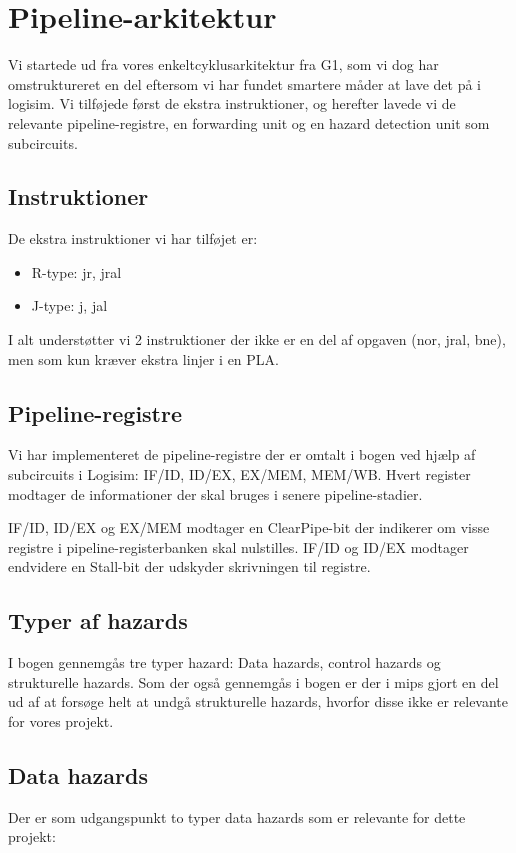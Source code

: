\section{Pipeline-arkitektur}

Vi startede ud fra vores enkeltcyklusarkitektur fra G1, som vi dog har omstruktureret en del
eftersom vi har fundet smartere måder at lave det på i logisim. Vi tilføjede først de ekstra
instruktioner, og herefter lavede vi de relevante pipeline-registre, en forwarding unit og 
en hazard detection unit som subcircuits.  

\subsection{Instruktioner}
De ekstra instruktioner vi har tilføjet er:
\begin{itemize}
\item R-type: jr, jral
\item J-type: j, jal
\end{itemize}

I alt understøtter vi 2 instruktioner der ikke er en del af opgaven (nor, jral, bne), men som kun kræver ekstra
linjer i en PLA. 

\subsection{Pipeline-registre}

Vi har implementeret de pipeline-registre der er omtalt i bogen ved hjælp af
subcircuits i Logisim: IF/ID, ID/EX, EX/MEM, MEM/WB. Hvert register modtager
de informationer der skal bruges i senere pipeline-stadier.

IF/ID, ID/EX og EX/MEM modtager en ClearPipe-bit der indikerer om visse
registre i pipeline-registerbanken skal nulstilles. IF/ID og ID/EX modtager
endvidere en Stall-bit der udskyder skrivningen til registre.

\subsection{Typer af hazards}
I bogen gennemgås tre typer hazard: Data hazards, control hazards og
strukturelle hazards. Som der også gennemgås i bogen er der i mips gjort en del
ud af at forsøge helt at undgå strukturelle hazards, hvorfor disse ikke er
relevante for vores projekt.

\subsection{Data hazards}
Der er som udgangspunkt to typer data hazards som er relevante for dette projekt:


